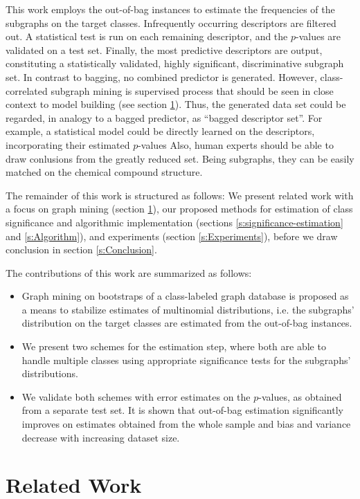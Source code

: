 \documentclass{article}
\begin{document}
This work employs the out-of-bag instances to estimate the frequencies of the
subgraphs on the target classes. Infrequently occurring descriptors are
filtered out. A statistical test is run on each remaining descriptor, and the
$p$-values are validated on a test set. Finally, the most predictive
descriptors are output, constituting a statistically validated, highly
significant, discriminative subgraph set.  In contrast to bagging, no combined
predictor is generated.  However, class-correlated subgraph mining is
supervised process that should be seen in close context to model building (see
section \ref{s:relatedWork}). Thus, the generated data set could be regarded,
in analogy to a bagged predictor, as ``bagged descriptor set''. For example, a
statistical model could be directly learned on the descriptors, incorporating their
estimated $p$-values Also, human experts should be able to draw conlusions from
the greatly reduced set. Being subgraphs, they can be easily matched on the
chemical compound structure.

The remainder of this work is structured as follows: We present related work with a focus on graph mining
(section \ref{s:relatedWork}), our proposed methods for estimation of class significance
and algorithmic implementation (sections \ref{s:significance-estimation} and
\ref{s:Algorithm}), and experiments (section \ref{s:Experiments}), before we draw
conclusion in section \ref{s:Conclusion}.

The contributions of this work are summarized as follows:
\begin{itemize}
  \item Graph mining on bootstraps of a class-labeled graph database is
    proposed as a means to stabilize estimates of multinomial distributions,
    i.e. the subgraphs' distribution on the target classes are estimated
    from the out-of-bag instances.
  \item We present two schemes for the estimation step, where both are
    able to handle multiple classes using appropriate significance tests for
    the subgraphs' distributions. 
  \item We validate both schemes with error estimates on the $p$-values, as
    obtained from a separate test set. It is shown that out-of-bag estimation
    significantly improves on estimates obtained from the whole sample and bias
    and variance decrease with increasing dataset size.
\end{itemize}


\section{Related Work}
\label{s:relatedWork}
\end{document}
